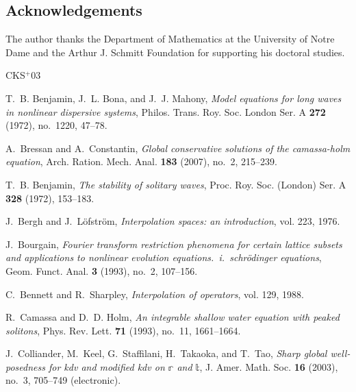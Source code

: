 \documentclass[12pt,reqno]{amsart}
\numberwithin{equation}{section}  %
\numberwithin{figure}{section}
\begin{document}
\subsection*{Acknowledgements} The author
thanks the Department of Mathematics at the University of Notre Dame and
the Arthur J. Schmitt Foundation for supporting his doctoral studies.
%
%
\newcommand{\etalchar}[1]{$^{#1}$}
\providecommand{\bysame}{\leavevmode\hbox to3em{\hrulefill}\thinspace}
\providecommand{\MR}{\relax\ifhmode\unskip\space\fi MR }
\providecommand{\MRhref}[2]{%
\href{http://www.ams.org/mathscinet-getitem?mr=#1}{#2}
}
\providecommand{\href}[2]{#2}
\begin{thebibliography}{CKS{\etalchar{+}}03}

T.~B. Benjamin, J.~L. Bona, and J.~J. Mahony, \emph{Model equations for long
waves in nonlinear dispersive systems}, Philos. Trans. Roy. Soc. London Ser.
A \textbf{272} (1972), no.~1220, 47--78.

A.~Bressan and A.~Constantin, \emph{Global conservative solutions of the
camassa-holm equation}, Arch. Ration. Mech. Anal. \textbf{183} (2007), no.~2,
215--239.

T.~B. Benjamin, \emph{The stability of solitary waves}, Proc. Roy. Soc.
(London) Ser. A \textbf{328} (1972), 153--183.

J.~Bergh and J.~L{\"o}fstr{\"o}m, \emph{Interpolation spaces: an introduction},
vol. 223, 1976.

J.~Bourgain, \emph{Fourier transform restriction phenomena for certain lattice
subsets and applications to nonlinear evolution equations.\ i.\ schr{\"o}dinger
equations}, Geom. Funct. Anal. \textbf{3} (1993), no.~2, 107--156.

C.~Bennett and R.~Sharpley, \emph{Interpolation of operators}, vol. 129, 1988.

R.~Camassa and D.~D. Holm, \emph{An integrable shallow water equation with
peaked solitons}, Phys. Rev. Lett. \textbf{71} (1993), no.~11, 1661--1664.

\bibitem[CKS{\etalchar{+}}03]{Colliander:2003kx}
J.~Colliander, M.~Keel, G.~Staffilani, H.~Takaoka, and T.~Tao, \emph{Sharp
global well-posedness for kdv and modified kdv on $\mathbb r$ and $\mathbb t$}, J. Amer. Math. Soc. \textbf{16} (2003), no.~3, 705--749 (electronic).


\end{thebibliography}
\end{document}
